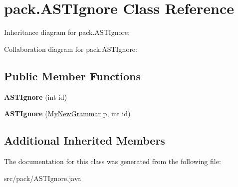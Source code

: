 \hypertarget{classpack_1_1_a_s_t_ignore}{}\section{pack.\+A\+S\+T\+Ignore Class Reference}
\label{classpack_1_1_a_s_t_ignore}


Inheritance diagram for pack.\+A\+S\+T\+Ignore\+:


Collaboration diagram for pack.\+A\+S\+T\+Ignore\+:
\subsection*{Public Member Functions}
\begin{DoxyCompactItemize}
\item 
{\bfseries A\+S\+T\+Ignore} (int id)\hypertarget{classpack_1_1_a_s_t_ignore_ac472e5ac6d71d2cf0baf2a2e58bffc72}{}\label{classpack_1_1_a_s_t_ignore_ac472e5ac6d71d2cf0baf2a2e58bffc72}

\item 
{\bfseries A\+S\+T\+Ignore} (\hyperlink{classpack_1_1_my_new_grammar}{My\+New\+Grammar} p, int id)\hypertarget{classpack_1_1_a_s_t_ignore_a21687cebc54b142f8c96f139f49fca1d}{}\label{classpack_1_1_a_s_t_ignore_a21687cebc54b142f8c96f139f49fca1d}

\end{DoxyCompactItemize}
\subsection*{Additional Inherited Members}


The documentation for this class was generated from the following file\+:\begin{DoxyCompactItemize}
\item 
src/pack/A\+S\+T\+Ignore.\+java\end{DoxyCompactItemize}
